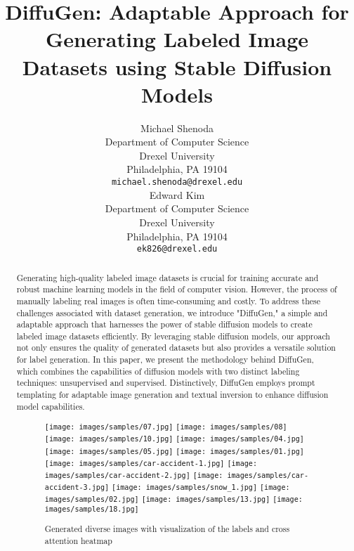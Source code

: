 \documentclass{article}
\title{DiffuGen: Adaptable Approach for Generating Labeled Image Datasets using Stable Diffusion Models}
\author{
  Michael Shenoda\\
  Department of Computer Science\\
  Drexel University\\
  Philadelphia, PA 19104 \\
  \texttt{michael.shenoda@drexel.edu}\\
  \And
  Edward Kim \\
  Department of Computer Science\\
  Drexel University\\
  Philadelphia, PA 19104 \\
  \texttt{ek826@drexel.edu} \\
}
\begin{document}
\maketitle

\begin{abstract}
    Generating high-quality labeled image datasets is crucial for training accurate and robust machine learning models in the field of computer vision. However, the process of manually labeling real images is often time-consuming and costly. To address these challenges associated with dataset generation, we introduce "DiffuGen," a simple and adaptable approach that harnesses the power of stable diffusion models to create labeled image datasets efficiently. By leveraging stable diffusion models, our approach not only ensures the quality of generated datasets but also provides a versatile solution for label generation. In this paper, we present the methodology behind DiffuGen, which combines the capabilities of diffusion models with two distinct labeling techniques: unsupervised and supervised. Distinctively, DiffuGen employs prompt templating for adaptable image generation and textual inversion to enhance diffusion model capabilities. 
    \begin{figure}[H]
        \centering

            \texttt{[image: images/samples/07.jpg]}
            \hfill
            \texttt{[image: images/samples/08]}
            \hfill
            \texttt{[image: images/samples/10.jpg]}
            \hfill
            \texttt{[image: images/samples/04.jpg]}
            \hfill
            \texttt{[image: images/samples/05.jpg]}
            \hfill
            \texttt{[image: images/samples/01.jpg]}
            \hfill
            \texttt{[image: images/samples/car-accident-1.jpg]}
            \hfill
            \texttt{[image: images/samples/car-accident-2.jpg]}
            \hfill
            \texttt{[image: images/samples/car-accident-3.jpg]}
            \hfill
            \texttt{[image: images/samples/snow\_1.jpg]}
            \hfill
            \texttt{[image: images/samples/02.jpg]}
            \hfill
            \texttt{[image: images/samples/13.jpg]}
            \texttt{[image: images/samples/18.jpg]}
 
        \caption{Generated diverse images with visualization of the labels and cross attention heatmap}
        \label{fig:abstract_images}
    \end{figure}
\end{abstract}
\end{document}
